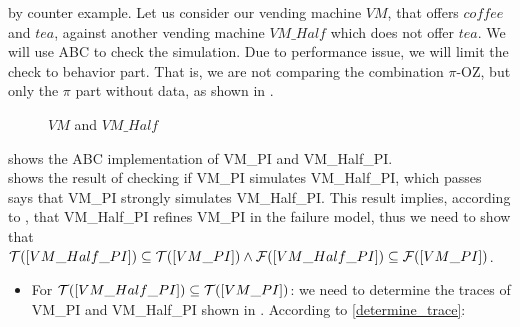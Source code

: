 \begin{prf}
by counter example. Let us consider our vending machine $VM$, that offers $coffee$ and $tea$, against another vending machine $VM\_Half$ which does not offer $tea$. We will use ABC to check the simulation. Due to performance issue, we will limit the check to behavior part. That is, we are not comparing the combination $\pi$-OZ, but only the $\pi$ part   without data, as shown in .
\begin{figure}[H]%
\centering
{}%
\qquad
{}%
\caption{$VM$ and $VM\_Half$}
\label{vm_and_vmHalf}
\end{figure}

 shows the ABC implementation of VM\_PI and VM\_Half\_PI.\\
 shows the result of checking if VM\_PI simulates VM\_Half\_PI, which passes\\






 says that VM\_PI strongly simulates VM\_Half\_PI. This result implies, according to , that VM\_Half\_PI refines VM\_PI in the failure model, thus we need to show that $\traces[VM\_Half\_PI]\subseteq\traces[VM\_PI] \wedge \failures[VM\_Half\_PI]\subseteq\failures[VM\_PI]$.
\begin{itemize}
\item For $\traces[VM\_Half\_PI]\subseteq\traces[VM\_PI]$: we need to determine the traces of VM\_PI and VM\_Half\_PI  shown in . According to \ref{determine_trace}:


\end{itemize}
\end{prf}
